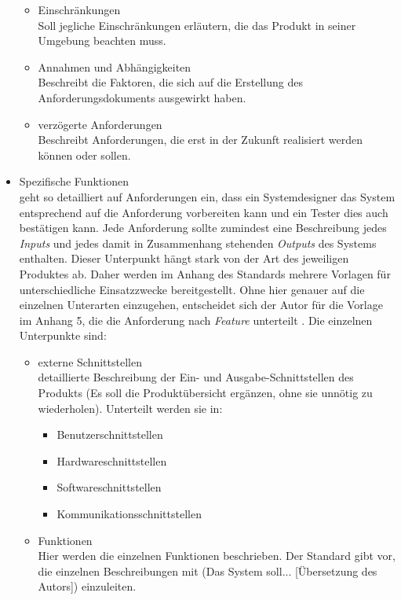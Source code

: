 \begin{itemize}
\begin{itemize}
		\item Einschränkungen \\
		Soll jegliche Einschränkungen erläutern, die das Produkt in seiner Umgebung beachten muss.
		\item Annahmen und Abhängigkeiten \\
		Beschreibt die Faktoren, die sich auf die Erstellung des Anforderungsdokuments ausgewirkt haben.
		\item verzögerte Anforderungen \\
		Beschreibt Anforderungen, die erst in der Zukunft realisiert werden können oder sollen.
	\end{itemize}
	\item Spezifische Funktionen \citep[vgl.][S. 15 - 20]{ieee1998}\\
	geht so detailliert auf Anforderungen ein, dass ein Systemdesigner das System entsprechend auf die Anforderung vorbereiten kann und ein Tester dies auch bestätigen kann. Jede Anforderung sollte zumindest eine Beschreibung jedes \textit{Inputs} und jedes damit in Zusammenhang stehenden \textit{Outputs} des Systems enthalten. Dieser Unterpunkt hängt stark von der Art des jeweiligen Produktes ab. Daher werden im Anhang des Standards mehrere Vorlagen für unterschiedliche Einsatzzwecke bereitgestellt. Ohne hier genauer auf die einzelnen Unterarten einzugehen, entscheidet sich der Autor für die Vorlage im Anhang 5, die die Anforderung nach \textit{Feature} unterteilt \citep[vgl.][23]{ieee1998}. Die einzelnen Unterpunkte sind:
	\begin{itemize}
		\item externe Schnittstellen \\
		detaillierte Beschreibung der Ein- und Ausgabe-Schnittstellen des Produkts (Es soll die Produktübersicht ergänzen, ohne sie unnötig zu wiederholen). Unterteilt werden sie in:
		\begin{itemize}
			\item Benutzerschnittstellen
			\item Hardwareschnittstellen
			\item Softwareschnittstellen
			\item Kommunikationsschnittstellen
		\end{itemize}
		\item Funktionen \\
		Hier werden die einzelnen Funktionen beschrieben. Der Standard gibt vor, die einzelnen Beschreibungen mit (Das System soll... [Übersetzung des Autors]) \citep[][16]{ieee1998} einzuleiten.

\end{itemize}
\end{itemize}
